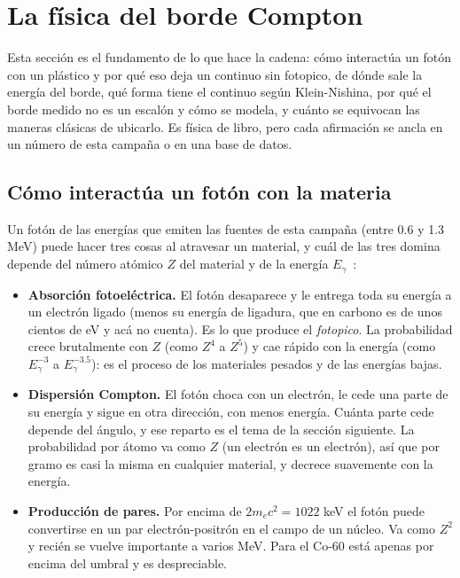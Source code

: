 \documentclass[11pt,a4paper]{article}
\begin{document}
\section{La física del borde Compton}
\label{sec:fisica}

Esta sección es el fundamento de lo que hace la cadena: cómo interactúa un
fotón con un plástico y por qué eso deja un continuo sin fotopico, de dónde
sale la energía del borde, qué forma tiene el continuo según Klein-Nishina,
por qué el borde medido no es un escalón y cómo se modela, y cuánto se
equivocan las maneras clásicas de ubicarlo. Es física de libro, pero cada
afirmación se ancla en un número de esta campaña o en una base de datos.

\subsection{Cómo interactúa un fotón con la materia}
\label{sec:interaccion}

Un fotón de las energías que emiten las fuentes de esta campaña (entre 0.6 y
1.3 MeV) puede hacer tres cosas al atravesar un material, y cuál de las tres
domina depende del número atómico $Z$ del material y de la energía
$E_\gamma$~\cite{knoll2010}:

\begin{itemize}
\item \textbf{Absorción fotoeléctrica.} El fotón desaparece y le entrega toda
      su energía a un electrón ligado (menos su energía de ligadura, que en
      carbono es de unos cientos de eV y acá no cuenta). Es lo que produce el
      \emph{fotopico}. La probabilidad crece brutalmente con $Z$ (como
      $Z^4$ a $Z^5$) y cae rápido con la energía (como $E_\gamma^{-3}$ a
      $E_\gamma^{-3.5}$): es el proceso de los materiales pesados y de las
      energías bajas.
\item \textbf{Dispersión Compton.} El fotón choca con un electrón, le cede
      una parte de su energía y sigue en otra dirección, con menos energía.
      Cuánta parte cede depende del ángulo, y ese reparto es el tema de la
      sección siguiente. La probabilidad por átomo va como $Z$ (un electrón
      es un electrón), así que por gramo es casi la misma en cualquier
      material, y decrece suavemente con la energía.
\item \textbf{Producción de pares.} Por encima de $2 m_e c^2 = 1022$ keV el
      fotón puede convertirse en un par electrón-positrón en el campo de un
      núcleo. Va como $Z^2$ y recién se vuelve importante a varios MeV. Para
      el Co-60 está apenas por encima del umbral y es despreciable.
\end{itemize}
\end{document}
